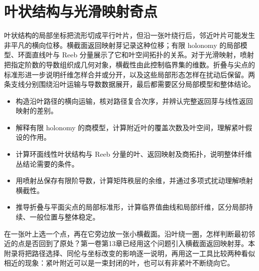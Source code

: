 
% 
% 
% 
% 
% 
% 

\chapter{叶状结构与光滑映射奇点}
\label{g2:app:D}

\begin{chapterabstract}
	叶状结构的局部坐标把流形切成平行叶片，但沿一张叶绕行后，邻近叶片可能发生非平凡的横向位移。横截面返回映射芽记录这种位移；有限 holonomy 的局部模型、环面直线叶与 Reeb 分量展示了它和叶空间拓扑的关系。对于光滑映射，喷射把指定阶数的导数组织成几何对象，横截性由此控制临界集的维数。折叠与尖点的标准形进一步说明纤维怎样合并或分开，以及这些局部形态怎样在扰动后保留。两条支线分别围绕沿叶运输与导数数据展开，最后都需要区分局部模型和整体结论。
\end{chapterabstract}

\begin{learninggoals}
	\begin{itemize}
		\item 构造沿叶路径的横向运输，核对路径复合次序，并辨认完整返回芽与线性返回映射的差别。
		\item 解释有限 holonomy 的商模型，计算附近叶的覆盖次数及叶空间，理解紧叶假设的作用。
		\item 计算环面线性叶状结构与 Reeb 分量的叶、返回映射及商拓扑，说明整体纤维丛结论需要的条件。
		\item 用喷射丛保存有限阶导数，计算矩阵秩层的余维，并通过多项式扰动理解喷射横截性。
		\item 推导折叠与平面尖点的局部标准形，计算临界值曲线和局部纤维，区分局部持续、一般位置与整体稳定。
	\end{itemize}
\end{learninggoals}

在一张叶上选一个点，再在它旁边放一张小横截面。沿叶绕一圈，怎样判断最初邻近的点是否回到了原处？第一卷第13章已经用这个问题引入横截面返回映射芽。本附录将把路径选择、同伦与坐标改变的影响逐一说明，再用这一工具比较两种看似相近的现象：紧叶附近可以是一束封闭的叶，也可以有非紧叶不断绕向它。

